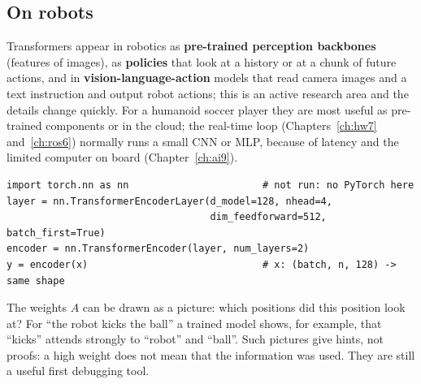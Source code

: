 \subsection*{On robots}
Transformers appear in robotics as \textbf{pre-trained perception backbones} (features of images), as \textbf{policies} that look at a history or at a chunk of future actions, and in \textbf{vision-language-action} models that read camera images and a text instruction and output robot actions; this is an active research area and the details change quickly. For a humanoid soccer player they are most useful as pre-trained components or in the cloud; the real-time loop (Chapters~\ref{ch:hw7} and~\ref{ch:ros6}) normally runs a small CNN or MLP, because of latency and the limited computer on board (Chapter~\ref{ch:ai9}).

\begin{verbatim}
import torch.nn as nn                       # not run: no PyTorch here
layer = nn.TransformerEncoderLayer(d_model=128, nhead=4,
                                   dim_feedforward=512, batch_first=True)
encoder = nn.TransformerEncoder(layer, num_layers=2)
y = encoder(x)                              # x: (batch, n, 128) -> same shape
\end{verbatim}

\begin{aibox}
The weights $A$ can be drawn as a picture: which positions did this position look at? For ``the robot kicks the ball'' a trained model shows, for example, that ``kicks'' attends strongly to ``robot'' and ``ball''. Such pictures give hints, not proofs: a high weight does not mean that the information was used. They are still a useful first debugging tool.
\end{aibox}


